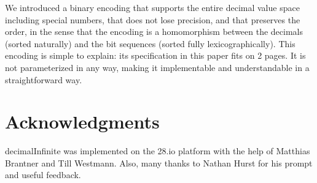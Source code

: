 \documentclass{acm_proc_article-sp}
\begin{document}
We introduced a binary encoding that supports the entire decimal value space including special numbers, that does not lose precision, and that preserves the order, in the sense that the encoding is a homomorphism between the decimals (sorted naturally) and the bit sequences (sorted fully lexicographically). This encoding is simple to explain: its specification in this paper fits on 2 pages. It is not parameterized in any way, making it implementable and understandable in a straightforward way.

\section{Acknowledgments}
decimalInfinite was implemented on the 28.io platform with the help of Matthias Brantner and Till Westmann. Also, many thanks to Nathan Hurst for his prompt and useful feedback.



\end{document}
